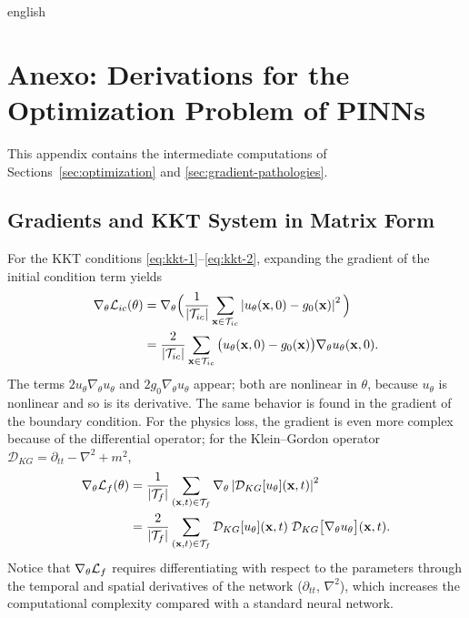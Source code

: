 \documentclass[0000.tex]{subfiles}
\begin{document}

\begin{hyphenrules}{english}

\chapter{Anexo: Derivations for the Optimization Problem of PINNs}\label{app:optimization}

This appendix contains the intermediate computations of Sections~\ref{sec:optimization} and
\ref{sec:gradient-pathologies}.

\section{Gradients and KKT System in Matrix Form}\label{app-sec:kkt-gradients}

For the KKT conditions \eqref{eq:kkt-1}--\eqref{eq:kkt-2}, expanding the gradient of the initial
condition term yields
\begin{align}
  \nabla_\theta\mathcal{L}_{ic}(\theta)
  &=\nabla_\theta\Big(\frac{1}{\left\lvert \mathcal{T}_{ic} \right\rvert}\sum_{\mathbf{x}\in\mathcal{T}_{ic}}\left\lvert u_\theta(\mathbf{x},0)-g_0(\mathbf{x}) \right\rvert^2\Big) \label{eq:grad-ic-1}\\
  &=\frac{2}{\left\lvert \mathcal{T}_{ic} \right\rvert}\sum_{\mathbf{x}\in\mathcal{T}_{ic}}\big(u_\theta(\mathbf{x},0)-g_0(\mathbf{x})\big)\nabla_\theta u_\theta(\mathbf{x},0). \label{eq:grad-ic-2}
\end{align}
The terms $2u_\theta\nabla_\theta u_\theta$ and $2g_0\nabla_\theta u_\theta$ appear; both are nonlinear in
$\theta$, because $u_\theta$ is nonlinear and so is its derivative. The same behavior is found in the
gradient of the boundary condition. For the physics loss, the gradient is even more complex because of
the differential operator; for the Klein--Gordon operator
$\mathcal{D}_{KG}=\partial_{tt}-\nabla^2+m^2$,
\begin{align}
  \nabla_\theta\mathcal{L}_f(\theta)
  &=\frac{1}{\left\lvert \mathcal{T}_f \right\rvert}\sum_{(\mathbf{x},t)\in\mathcal{T}_f}\nabla_\theta\left\lvert \mathcal{D}_{KG}[u_\theta](\mathbf{x},t) \right\rvert^2 \label{eq:grad-f-1}\\
  &=\frac{2}{\left\lvert \mathcal{T}_f \right\rvert}\sum_{(\mathbf{x},t)\in\mathcal{T}_f}\mathcal{D}_{KG}[u_\theta](\mathbf{x},t)\;
    \mathcal{D}_{KG}\big[\nabla_\theta u_\theta\big](\mathbf{x},t). \label{eq:grad-f-2}
\end{align}
Notice that $\nabla_\theta\mathcal{L}_f$ requires differentiating with respect to the parameters through the
temporal and spatial derivatives of the network ($\partial_{tt}$, $\nabla^2$), which increases the
computational complexity compared with a standard neural network.


\end{hyphenrules}
\end{document}
